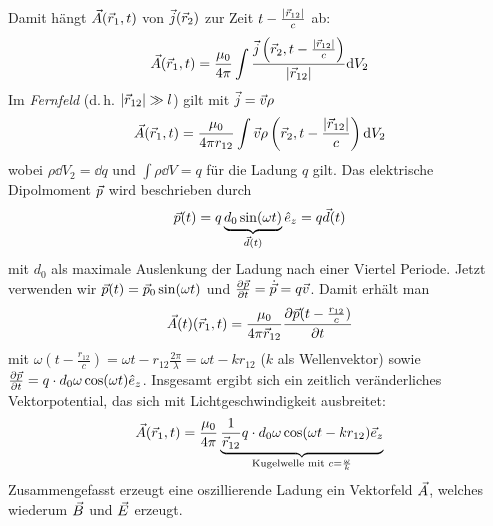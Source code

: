 Damit hängt $\vecA(\vecr_1, t)$ von $\vecj(\vecr_2)$ zur Zeit 
$t-\frac{|\vecr_{12}|}{c}$ ab:
\begin{gather*}
  \vecA(\vecr_1, t) = \frac{\muo}{4\pi} \int
  \frac
  {\vecj\left( \vecr_2, t-\frac{|\vecr_{12}|}{c} \right)}
  {|\vecr_{12}|}
  \dd V_2
\end{gather*}
Im \emph{Fernfeld}
(d.\,h. $|\vecr_{12}|\gg l$) gilt mit $\vecj = \vecv\rho$
\begin{gather*}
  \vecA(\vecr_1, t) = \frac{\muo}{4\pi r_{12}} \int
  \vecv \rho\left( \vecr_2, t-\frac{|\vecr_{12}|}{c} \right)
  \dd V_2
\end{gather*}
wobei $\rho \dd V_2 = \dd q$ und $\int\rho\dd V = q$ für die Ladung $q$
gilt.
Das elektrische Dipolmoment $\vecp$ wird beschrieben durch
\begin{gather*}
  \vecp(t) = q\underbrace{d_0\sin(\omega t)}_{\vecd(t)}\hat{e}_z
  = q\vecd(t)
\end{gather*}
mit $d_0$ als maximale Auslenkung der Ladung nach einer Viertel
Periode.
Jetzt verwenden wir $\vecp(t) = \vecp_0 \sin(\omega t)$ und
$\dif[\vecp]{t} = \dot{\vecp} = q\vecv$.
Damit erhält man
\begin{gather*}
  \vecA(t)(\vecr_1, t) = \frac{\muo}{4\pi\vecr_{12}}
  \dif[\vecp(t-\frac{r_{12}}{c})]{t}
\end{gather*}
mit $\omega(t-\frac{r_{12}}{c}) = \omega t- r_{12}\frac{2\pi}{\lambda}
= \omega t - kr_{12}$ ($k$ als Wellenvektor) sowie
$\dif[\vecp]{t} = q\cdot d_0\omega\cos(\omega t) \hat e_z$.
Insgesamt ergibt sich ein zeitlich veränderliches Vektorpotential, das
sich mit Lichtgeschwindigkeit ausbreitet:
\begin{gather*}
  \vecA(\vecr_1,t) = \frac{\muo}{4\pi}
  \underbrace{
    \frac{1}{\vecr_{12}} q\cdot d_0\omega\cos(\omega t-kr_{12})
    \vece_z
  }_{\text{Kugelwelle mit }c=\frac{\omega}{k}}
\end{gather*}
Zusammengefasst erzeugt eine oszillierende Ladung ein Vektorfeld
$\vecA$, welches wiederum $\vecB$ und $\vecE$ erzeugt.

